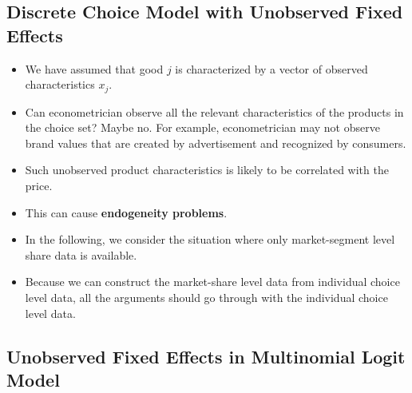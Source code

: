 \documentclass[]{book}
\providecommand{\tightlist}{%
  \setlength{\itemsep}{0pt}\setlength{\parskip}{0pt}}
\begin{document}
\subsection{Discrete Choice Model with Unobserved Fixed
Effects}\label{discrete-choice-model-with-unobserved-fixed-effects}

\begin{itemize}
\tightlist
\item
  We have assumed that good \(j\) is characterized by a vector of
  observed characteristics \(x_j\).
\item
  Can econometrician observe all the relevant characteristics of the
  products in the choice set? Maybe no. For example, econometrician may
  not observe brand values that are created by advertisement and
  recognized by consumers.
\item
  Such unobserved product characteristics is likely to be correlated
  with the price.
\item
  This can cause \textbf{endogeneity problems}.
\item
  In the following, we consider the situation where only market-segment
  level share data is available.
\item
  Because we can construct the market-share level data from individual
  choice level data, all the arguments should go through with the
  individual choice level data.
\end{itemize}

\subsection{Unobserved Fixed Effects in Multinomial Logit
Model}\label{unobserved-fixed-effects-in-multinomial-logit-model}
\end{document}
